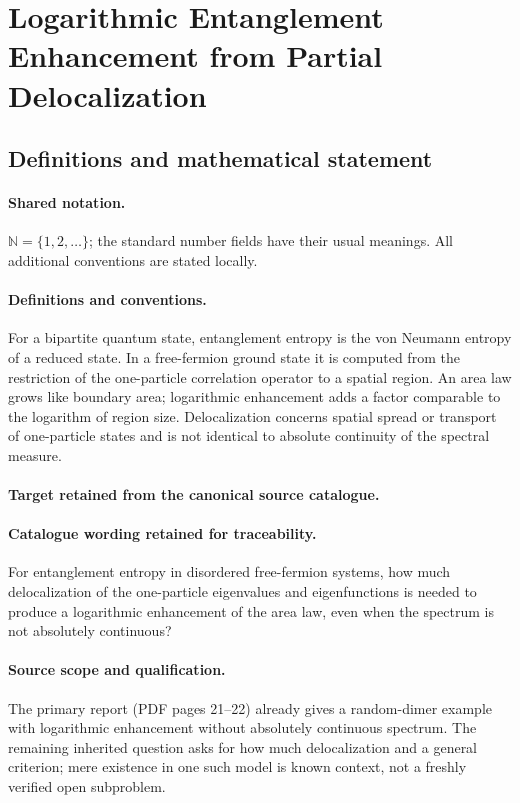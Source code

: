 \documentclass[11pt]{article}
\begin{document}
\section{Logarithmic Entanglement Enhancement from Partial Delocalization}\label{statement}

\subsection{Definitions and mathematical statement}

\paragraph{Shared notation.}$\mathbb N=\{1,2,\ldots\}$; the standard number fields have their usual meanings. All additional conventions are stated locally.


\paragraph{Definitions and conventions.}
For a bipartite quantum state, entanglement entropy is the von Neumann entropy of a reduced state. In a free-fermion ground state it is computed from the restriction of the one-particle correlation operator to a spatial region. An area law grows like boundary area; logarithmic enhancement adds a factor comparable to the logarithm of region size. Delocalization concerns spatial spread or transport of one-particle states and is not identical to absolute continuity of the spectral measure.

\paragraph{Target retained from the canonical source catalogue.}
\paragraph{Catalogue wording retained for traceability.}
For entanglement entropy in disordered free-fermion systems, how much delocalization of the one-particle eigenvalues and eigenfunctions is needed to produce a logarithmic enhancement of the area law, even when the spectrum is not absolutely continuous?

\paragraph{Source scope and qualification.}
The primary report (PDF pages 21--22) already gives a random-dimer example with logarithmic enhancement without absolutely continuous spectrum. The remaining inherited question asks for how much delocalization and a general criterion; mere existence in one such model is known context, not a freshly verified open subproblem.
\end{document}
